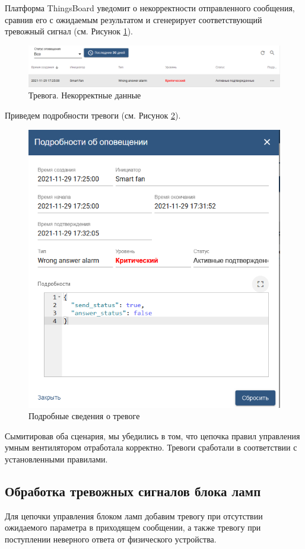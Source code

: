 \documentclass[a4paper,14pt]{extarticle}
\begin{document}
Платформа ThingsBoard уведомит о некорректности отправленного сообщения, сравнив его с ожидаемым результатом и сгенерирует соответствующий тревожный сигнал (см. Рисунок \ref{fig:alarm-wrong-response}).

\begin{figure}[h!]
	\centering
	\includegraphics[width=1\linewidth]{images/alarm-wrong-response}
	\caption{Тревога. Некорректные данные}
	\label{fig:alarm-wrong-response}
\end{figure}
\newpage
Приведем подробности тревоги (см. Рисунок \ref{fig:alarm-wrong-response-detail}).
\begin{figure}[h!]
	\centering
	\includegraphics[width=0.6\linewidth]{images/alarm-wrong-response-detail}
	\caption{Подробные сведения о тревоге}
	\label{fig:alarm-wrong-response-detail}
\end{figure}

Сымитировав оба сценария, мы убедились в том, что цепочка правил управления умным вентилятором отработала корректно. Тревоги сработали в соответствии с установленными правилами.

\subsection{Обработка тревожных сигналов блока ламп}

Для цепочки управления блоком ламп добавим тревогу при отсутствии ожидаемого параметра в приходящем сообщении, а также тревогу при поступлении неверного ответа от физического устройства.
\end{document}
